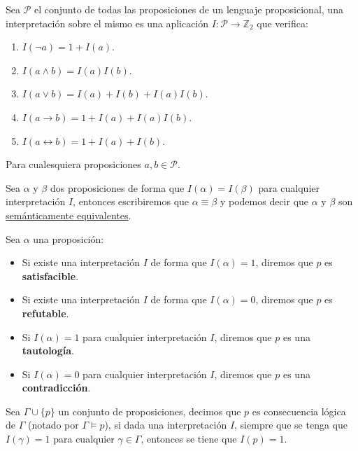 \begin{definicion}[Interpretación]
    Sea $\mathcal{P}$ el conjunto de todas las proposiciones de un lenguaje proposicional, una interpretación sobre el mismo es una aplicación $I:\mathcal{P}\rightarrow\mathbb{Z}_2$ que verifica:
    \begin{enumerate}
        \item $I(\lnot a) = 1+ I(a)$.
        \item $I(a\land b) = I(a)I(b)$.
        \item $I(a\lor b) = I(a) + I(b) + I(a)I(b)$.
        \item $I(a\to b) = 1 + I(a) + I(a)I(b)$.
        \item $I(a\leftrightarrow b) = 1 + I(a) + I(b)$.
    \end{enumerate}
    Para cualesquiera proposiciones $a,b\in \mathcal{P}$.
\end{definicion}

\begin{definicion}
    Sea $\alpha$ y $\beta$ dos proposiciones de forma que $I(\alpha)=I(\beta)$ para cualquier interpretación $I$, entonces escribiremos que $\alpha\equiv\beta$ y podemos decir que $\alpha$ y $\beta$ son \underline{semánticamente equivalentes}.
\end{definicion}

\begin{definicion}
    Sea $\alpha$ una proposición: 
    \begin{itemize}
        \item Si existe una interpretación $I$ de forma que $I(\alpha)=1$, diremos que $p$ es \textbf{satisfacible}.
        \item Si existe una interpretación $I$ de forma que $I(\alpha)=0$, diremos que $p$ es \textbf{refutable}.
        \item Si $I(\alpha)=1$ para cualquier interpretación $I$, diremos que $p$ es una \textbf{tautología}.
        \item Si $I(\alpha)=0$ para cualquier interpretación $I$, diremos que $p$ es una \textbf{contradicción}.
    \end{itemize}
\end{definicion}

\begin{definicion}
    Sea $\Gamma\cup\{p\}$ un conjunto de proposiciones, decimos que $p$ es consecuencia lógica de $\Gamma$ (notado por $\Gamma\vDash p$), si dada una interpretación $I$, siempre que se tenga que $I(\gamma) = 1$ para cualquier $\gamma\in \Gamma$, entonces se tiene que $I(p)= 1$.
\end{definicion}

